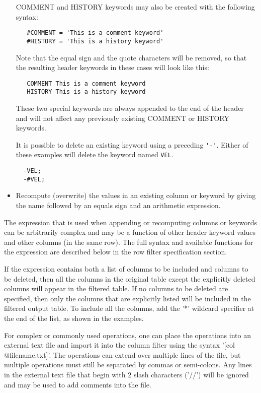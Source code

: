 \documentclass[11pt]{book}
\begin{document}
\begin{itemize}
COMMENT and HISTORY keywords may also be created with the following syntax:

\begin{verbatim}
   #COMMENT = 'This is a comment keyword'
   #HISTORY = 'This is a history keyword'
\end{verbatim}
Note that the equal sign and the quote characters will be removed, so
that the resulting header keywords in these cases will look like this:

\begin{verbatim}
   COMMENT This is a comment keyword
   HISTORY This is a history keyword
\end{verbatim}
These two special keywords are always appended to the end of the header
and will not affect any previously existing COMMENT or HISTORY keywords.

It is possible to delete an existing keyword using a preceding \verb+'-'+.
Either of these examples will delete the keyword named \verb+VEL+.
\begin{verbatim}
  -VEL;
  -#VEL;
\end{verbatim}

\item
Recompute (overwrite) the values in an existing column or keyword by
giving the name followed by an equals sign and an arithmetic
expression.
\end{itemize}

The expression that is used when appending or recomputing columns or
keywords can be arbitrarily complex and may be a function of other
header keyword values and other columns (in the same row).  The full
syntax and available functions for the expression are described below
in the row filter specification section.

If the expression contains both a list of columns to be included and
columns to be deleted, then all the columns in the original table
except the explicitly deleted columns will appear in the filtered
table.  If no columns to be deleted are specified, then only the
columns that are explicitly listed will be included in the filtered
output table.  To include all the columns, add the '*' wildcard
specifier at the end of the list, as shown in the examples.

For  complex  or commonly used operations,  one  can  place the
operations into an external text  file and import it  into the  column
filter using  the syntax '[col @filename.txt]'.   The operations can
extend over multiple lines of the  file, but multiple operations must
still be separated by commas or semi-colons.   Any lines in the external text file
that begin with 2 slash characters ('//') will be ignored and may be
used to add comments into the file.
\end{document}
